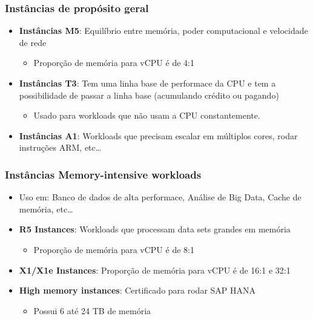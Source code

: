 \begin{frame}
	\frametitle{Instâncias de propósito geral}
	\begin{itemize}
		\item \textbf{Instâncias M5}: Equilíbrio entre memória, poder computacional e velocidade de rede
			\begin{itemize}
				\item Proporção de memória para vCPU é de 4:1
			\end{itemize}
		\item \textbf{Instâncias T3}: Tem uma linha base de performace da CPU e tem a possibilidade de passar a linha base (acumulando crédito ou pagando)
			\begin{itemize}
				\item Usado para workloads que não usam a CPU constantemente.
			\end{itemize}
		\item \textbf{Instâncias A1}: Workloads que precisam escalar em múltiplos cores, rodar instruções ARM, etc\dots
	\end{itemize}
\end{frame}

\begin{frame}
	\frametitle{Instâncias Memory-intensive workloads}
	\begin{itemize}
		\item Uso em: Banco de dados de alta performace, Análise de Big Data, Cache de memória, etc\dots
		\item \textbf{R5 Instances}: Workloads que processam data sets grandes em memória
			\begin{itemize}
				\item Proporção de memória para vCPU é de 8:1
			\end{itemize}
		\item \textbf{X1/X1e Instances}: Proporção de memória para vCPU é de 16:1 e 32:1
		\item \textbf{High memory instances}: Certificado para rodar SAP HANA
			\begin{itemize}
				\item Possui 6 até 24 TB de memória
			\end{itemize}
	\end{itemize}
\end{frame}

